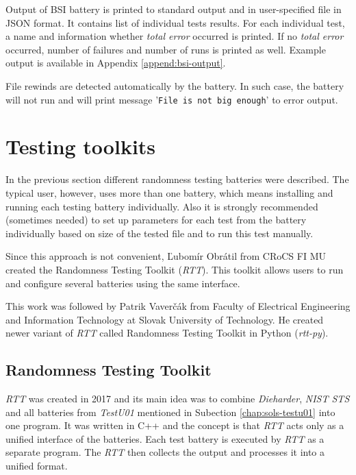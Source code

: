 \documentclass[
  digital,     %
  oneside,     %
  nosansbold,  %
  nocolorbold, %
  nolof,         %
  nolot,         %
]{fithesis4}
\begin{document}
Output of BSI battery is printed to standard output and in user-specified file in JSON format. It contains list of individual tests results. For each individual test, a name and information whether \emph{total error} occurred is printed. If no \emph{total error} occurred, number of failures and number of runs is printed as well. Example output is available in Appendix \ref{append:bsi-output}.

File rewinds are detected automatically by the battery. In such case, the battery will not run and will print message 
'\texttt{File is not big enough}' to error output.



\section{Testing toolkits}\label{chap:sols-toolkits}
In the previous section different randomness testing batteries were described. The typical user, however, uses more than one battery, which means installing and running each testing battery individually. Also it is strongly recommended (sometimes needed) to set up parameters for each test from the battery individually based on size of the tested file and to run this test manually.

Since this approach is not convenient, Ľubomír Obrátil from CRoCS FI MU created the Randomness Testing Toolkit (\emph{RTT}).\cite{rtt-obratil} This toolkit allows users to run and configure several batteries using the same interface.

This work was followed by Patrik Vaverčák from Faculty of Electrical Engineering and Information Technology at Slovak University of Technology. He created newer variant of \emph{RTT} called Randomness Testing Toolkit in Python (\emph{rtt-py}). \cite{vavercak}

\subsection{Randomness Testing Toolkit} \label{chap:sols-rtt}

\emph{RTT} was created in 2017 and its main idea was to combine \emph{Dieharder}, \emph{NIST STS} and all batteries from \emph{TestU01} mentioned in Subection \ref{chap:sols-testu01} into one program. It was written in C++ and the concept is that \emph{RTT} acts only as a unified interface of the batteries. Each test battery is executed by \emph{RTT} as a separate program. The \emph{RTT} then collects the output and processes it into a unified format.~\cite[p.~8]{rtt-obratil}
\end{document}
